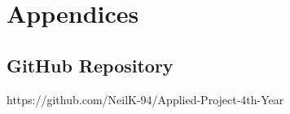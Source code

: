 \chapter{Appendices}
\section{GitHub Repository}
https://github.com/NeilK-94/Applied-Project-4th-Year